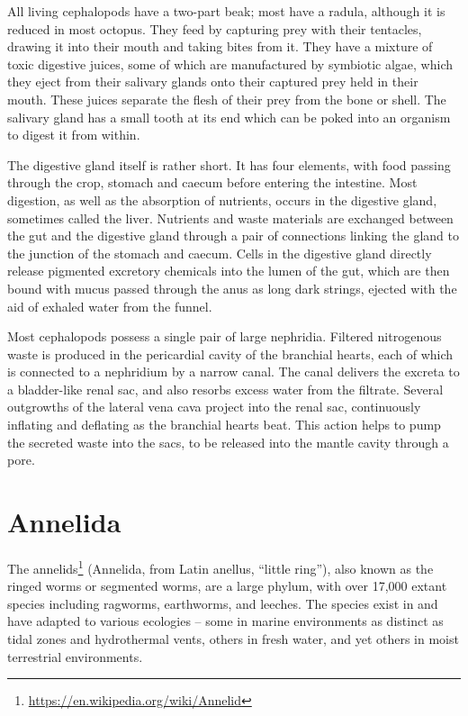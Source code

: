 \documentclass[]{book}
\let\rmarkdownfootnote\footnote%
\def\footnote{\protect\rmarkdownfootnote}
\renewcommand{\href}[2]{#2\footnote{\url{#1}}}
\begin{document}
All living cephalopods have a two-part beak; most have a radula, although it is reduced in most octopus. They feed by capturing prey with their tentacles, drawing it into their mouth and taking bites from it. They have a mixture of toxic digestive juices, some of which are manufactured by symbiotic algae, which they eject from their salivary glands onto their captured prey held in their mouth. These juices separate the flesh of their prey from the bone or shell. The salivary gland has a small tooth at its end which can be poked into an organism to digest it from within.

The digestive gland itself is rather short. It has four elements, with food passing through the crop, stomach and caecum before entering the intestine. Most digestion, as well as the absorption of nutrients, occurs in the digestive gland, sometimes called the liver. Nutrients and waste materials are exchanged between the gut and the digestive gland through a pair of connections linking the gland to the junction of the stomach and caecum. Cells in the digestive gland directly release pigmented excretory chemicals into the lumen of the gut, which are then bound with mucus passed through the anus as long dark strings, ejected with the aid of exhaled water from the funnel.

Most cephalopods possess a single pair of large nephridia. Filtered nitrogenous waste is produced in the pericardial cavity of the branchial hearts, each of which is connected to a nephridium by a narrow canal. The canal delivers the excreta to a bladder-like renal sac, and also resorbs excess water from the filtrate. Several outgrowths of the lateral vena cava project into the renal sac, continuously inflating and deflating as the branchial hearts beat. This action helps to pump the secreted waste into the sacs, to be released into the mantle cavity through a pore.

\hypertarget{annelida}{%
\section{Annelida}\label{annelida}}

The \href{https://en.wikipedia.org/wiki/Annelid}{annelids} (Annelida, from Latin anellus, ``little ring''), also known as the ringed worms or segmented worms, are a large phylum, with over 17,000 extant species including ragworms, earthworms, and leeches. The species exist in and have adapted to various ecologies -- some in marine environments as distinct as tidal zones and hydrothermal vents, others in fresh water, and yet others in moist terrestrial environments.
\end{document}
